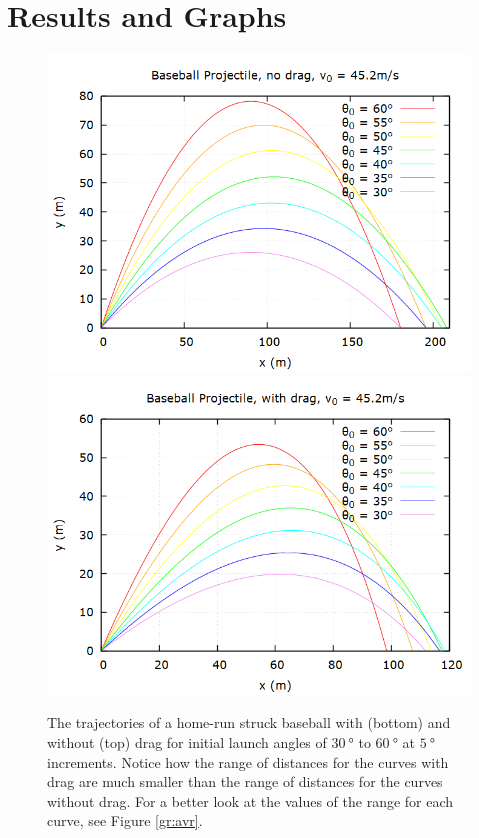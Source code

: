 \documentclass[aps,prl,twocolumn,superscriptaddress]{revtex4-1}
\begin{document}
\section{Results and Graphs}

\begin{figure}[htbp]
  	\begin{center}
 		\includegraphics[scale=0.3]{projnodrag.png}
 		\includegraphics[scale=0.3]{projwdrag.png}
  		\caption{The trajectories of a home-run struck baseball with (bottom) and without (top) drag for initial launch angles of $\SI{30}{\degree}$ to $\SI{60}{\degree}$ at $\SI{5}{\degree}$ increments. Notice how the range of distances for the curves with drag are much smaller than the range of distances for the curves without drag. For a better look at the values of the range for each curve, see Figure \ref{gr:avr}.}
  		\label{gr:projdrag}
 	\end{center}
\end{figure}
\end{document}
